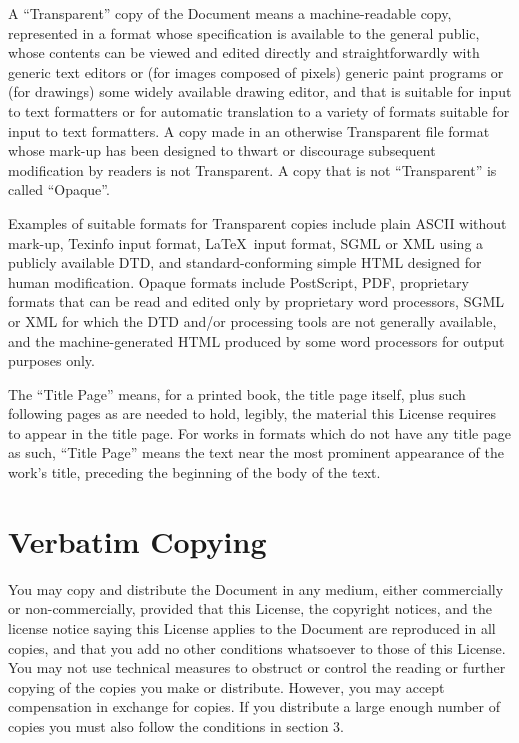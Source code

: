 \documentclass[oneside,a4paper]{book}
\begin{document}
A ``Transparent'' copy of the Document means a machine-readable copy,
represented in a format whose specification is available to the
general public, whose contents can be viewed and edited directly and
straightforwardly with generic text editors or (for images composed of
pixels) generic paint programs or (for drawings) some widely available
drawing editor, and that is suitable for input to text formatters or
for automatic translation to a variety of formats suitable for input
to text formatters.  A copy made in an otherwise Transparent file
format whose mark-up has been designed to thwart or discourage
subsequent modification by readers is not Transparent.  A copy that is
not ``Transparent'' is called ``Opaque''.

Examples of suitable formats for Transparent copies include plain
ASCII without mark-up, Texinfo input format, \LaTeX~input format, SGML
or XML using a publicly available DTD, and standard-conforming simple
HTML designed for human modification.  Opaque formats include
PostScript, PDF, proprietary formats that can be read and edited only
by proprietary word processors, SGML or XML for which the DTD and/or
processing tools are not generally available, and the
machine-generated HTML produced by some word processors for output
purposes only.

The ``Title Page'' means, for a printed book, the title page itself,
plus such following pages as are needed to hold, legibly, the material
this License requires to appear in the title page.  For works in
formats which do not have any title page as such, ``Title Page'' means
the text near the most prominent appearance of the work's title,
preceding the beginning of the body of the text.


\section{Verbatim Copying}

You may copy and distribute the Document in any medium, either
commercially or non-commercially, provided that this License, the
copyright notices, and the license notice saying this License applies
to the Document are reproduced in all copies, and that you add no other
conditions whatsoever to those of this License.  You may not use
technical measures to obstruct or control the reading or further
copying of the copies you make or distribute.  However, you may accept
compensation in exchange for copies.  If you distribute a large enough
number of copies you must also follow the conditions in section 3.
\end{document}
